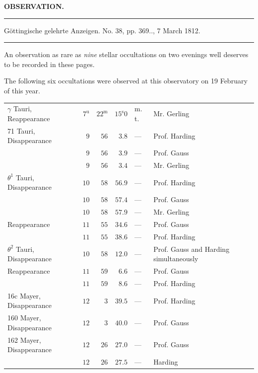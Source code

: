 \clearpage{}\hypertarget{native-353-lower}{}\label{native-353-lower}
\begin{center}\textbf{OBSERVATION.}\par\vspace{4pt}\hrule\vspace{4pt}\fontsize{10}{12}\selectfont Göttingische gelehrte Anzeigen. No. 38, pp. 369\;.., 7 March 1812.\par\vspace{4pt}\hrule\vspace{4pt}\end{center}

\par\indent An observation as rare as \emph{nine} stellar occultations on two evenings well deserves to be recorded in these pages.

\par\indent The following six occultations were observed at this observatory on 19 February of this year.

\begin{center}\fontsize{9}{11}\selectfont\setlength{\tabcolsep}{2.5pt}\renewcommand{\arraystretch}{1.15}\begin{tabular}{lrrrll}
$\gamma$ Tauri, Reappearance & $7^{\mathrm u}$ & $22^{\mathrm m}$ & $15^{\mathrm s}0$ & m.\,t. & Mr. Gerling\\
71 Tauri, Disappearance & $9$ & $56$ & $3.8$ & — & Prof. Harding\\
 & $9$ & $56$ & $3.9$ & — & Prof. Gauss\\
 & $9$ & $56$ & $3.4$ & — & Mr. Gerling\\
$\theta^1$ Tauri, Disappearance & $10$ & $58$ & $56.9$ & — & Prof. Harding\\
 & $10$ & $58$ & $57.4$ & — & Prof. Gauss\\
 & $10$ & $58$ & $57.9$ & — & Mr. Gerling\\
Reappearance & $11$ & $55$ & $34.6$ & — & Prof. Gauss\\
 & $11$ & $55$ & $38.6$ & — & Prof. Harding\\
$\theta^2$ Tauri, Disappearance & $10$ & $58$ & $12.0$ & — & Prof. Gauss and Harding simultaneously\\
Reappearance & $11$ & $59$ & $6.6$ & — & Prof. Gauss\\
 & $11$ & $59$ & $8.6$ & — & Prof. Harding\\
16c Mayer, Disappearance & $12$ & $3$ & $39.5$ & — & Prof. Harding\\
160 Mayer, Disappearance & $12$ & $3$ & $40.0$ & — & Prof. Gauss\\
162 Mayer, Disappearance & $12$ & $26$ & $27.0$ & — & Prof. Gauss\\
 & $12$ & $26$ & $27.5$ & — & Harding\\
\end{tabular}\end{center}

